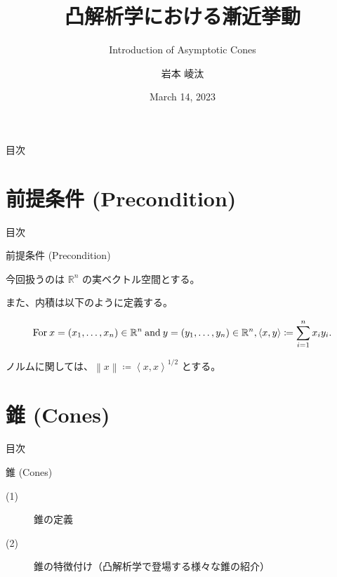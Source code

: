 \documentclass[aspectratio=169, dvipdfmx, 11pt]{beamer} %
\title[凸解析学における漸近挙動]{凸解析学における漸近挙動}
\subtitle{Introduction of Asymptotic Cones}
\author[岩本 崚汰]{岩本 崚汰}
\institute[新潟大学大学院]{新潟大学大学院自然科学研究科}
\date{March 14, 2023}
\begin{document}
\maketitle

\begin{frame}{目次}
    \tableofcontents
\end{frame}

\section{前提条件 (Precondition) }
\begin{frame}{目次}
    \tableofcontents[currentsection]
\end{frame}

\begin{frame}{前提条件 (Precondition) }

  今回扱うのは $\mathbb{R}^n$ の実ベクトル空間とする。

  また、内積は以下のように定義する。

  \begin{equation}
    \text{For}\: x=(x_1,\dots,x_n) \in \mathbb{R}^n \:\text{and}\: y=(y_1,\dots,y_n) \in \mathbb{R}^n, \left\langle x,y\right\rangle \coloneqq \sum_{i = 1}^{n} x_i y_i. \notag
  \end{equation}

  ノルムに関しては、$\left\lVert x \right\rVert \coloneqq \left\langle x,x\right\rangle ^{1/2} $ とする。

\end{frame}

\section{錐 (Cones) }
\begin{frame}{目次}
  \tableofcontents[currentsection]
\end{frame}

\begin{frame}{錐 (Cones) }
  \begin{description}
    \item[(1)] 錐の定義
    \item[(2)] 錐の特徴付け（凸解析学で登場する様々な錐の紹介）
  \end{description}
\end{frame}
\end{document}
